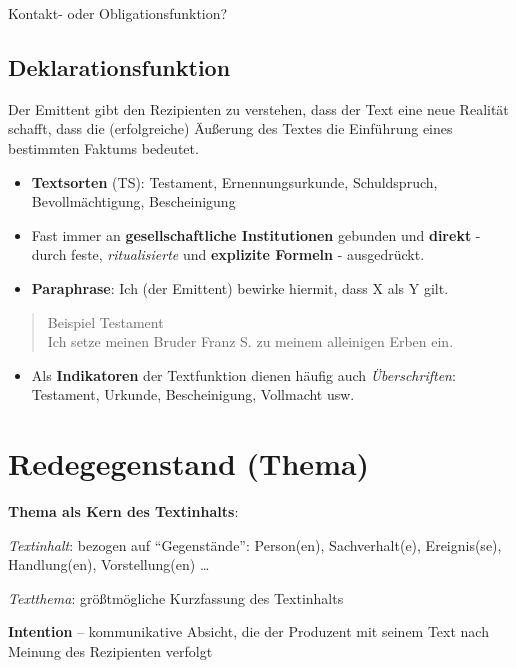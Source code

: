 \documentclass[
  letterpaper,
]{scrbook}
\providecommand{\tightlist}{%
  \setlength{\itemsep}{0pt}\setlength{\parskip}{0pt}}\usepackage{longtable,booktabs,array}
\begin{document}
Kontakt- oder Obligationsfunktion?

\hypertarget{deklarationsfunktion}{%
\subsection{Deklarationsfunktion}\label{deklarationsfunktion}}

Der Emittent gibt den Rezipienten zu verstehen, dass der Text eine neue
Realität schafft, dass die (erfolgreiche) Äußerung des Textes die
Einführung eines bestimmten Faktums bedeutet.

\begin{itemize}
\item
  \textbf{Textsorten} (TS): Testament, Ernennungsurkunde, Schuldspruch,
  Bevollmächtigung, Bescheinigung
\item
  Fast immer an \textbf{gesellschaftliche Institutionen} gebunden und
  \textbf{direkt} - durch feste, \emph{ritualisierte} und
  \textbf{explizite Formeln} - ausgedrückt.
\item
  \textbf{Paraphrase}: Ich (der Emittent) bewirke hiermit, dass X als Y
  gilt.
\end{itemize}

\begin{quote}
Beispiel Testament\\
Ich setze meinen Bruder Franz S. zu meinem alleinigen Erben ein.
\end{quote}

\begin{itemize}
\tightlist
\item
  Als \textbf{Indikatoren} der Textfunktion dienen häufig auch
  \emph{Überschriften}: Testament, Urkunde, Bescheinigung, Vollmacht
  usw.
\end{itemize}

\hypertarget{redegegenstand-thema}{%
\section{Redegegenstand (Thema)}\label{redegegenstand-thema}}

\textbf{Thema als Kern des Textinhalts}:

\emph{Textinhalt}: bezogen auf ``Gegenstände'': Person(en),
Sachverhalt(e), Ereignis(se), Handlung(en), Vorstellung(en) \ldots{}

\emph{Textthema}: größtmögliche Kurzfassung des Textinhalts

\textbf{Intention} -- kommunikative Absicht, die der Produzent mit
seinem Text nach Meinung des Rezipienten verfolgt
\end{document}
